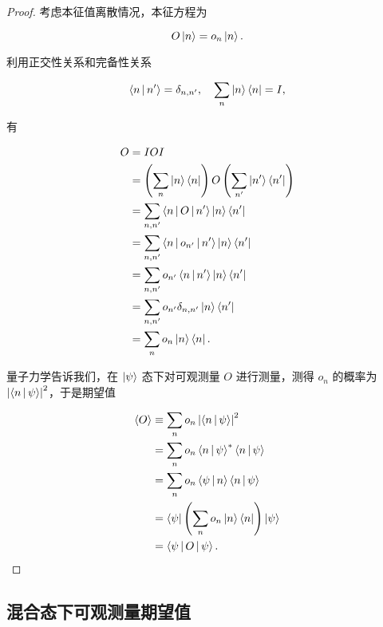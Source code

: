\begin{proof}

考虑本征值离散情况，本征方程为

\begin{equation}
O \Ket{n } = o_n \Ket{n }.
\end{equation}

利用正交性关系和完备性关系

\begin{equation}
\Braket{n | n' } = \delta_{n,n'},\quad
\sum_n \Ket{n }\Bra{n} = I,
\end{equation}

有

\begin{equation}
\begin{split}
O
&=I O I \\
&=\left(\sum_n \Ket{n }\Bra{n } \right) O \left(\sum_{n'} \Ket{n' }\Bra{n' } \right) \\
&=\sum_{n,n'} \Braket{n | O | n' } \Ket{n }\Bra{n' } \\
&=\sum_{n,n'} \Braket{n | o_{n'} | n' } \Ket{n }\Bra{n' } \\
&=\sum_{n,n'} o_{n'} \Braket{n | n' } \Ket{n }\Bra{n' } \\
&=\sum_{n,n'} o_{n'} \delta_{n,n'} \Ket{n }\Bra{n' } \\
&=\sum_{n} o_{n} \Ket{n }\Bra{n }.
\end{split}
\end{equation}

量子力学告诉我们，在 $\Ket{\psi } $ 态下对可观测量 $O $ 进行测量，测得 $o_n $ 的概率为 $\left|\Braket{n | \psi} \right|^2 $，于是期望值

\begin{equation}
\begin{split}
\Braket{O}
&\equiv \sum_n o_n \left|\Braket{n | \psi} \right|^2 \\
&=\sum_n o_n \Braket{n | \psi}^* \Braket{n | \psi} \\
&=\sum_n o_n \Braket{\psi | n} \Braket{n | \psi} \\
&=\Bra{\psi} \left(\sum_n o_n \ket{n} \bra{n} \right) \Ket{\psi } \\
&=\Braket{\psi | O | \psi}.
\end{split}
\end{equation}

\end{proof}

\subsection{混合态下可观测量期望值}

